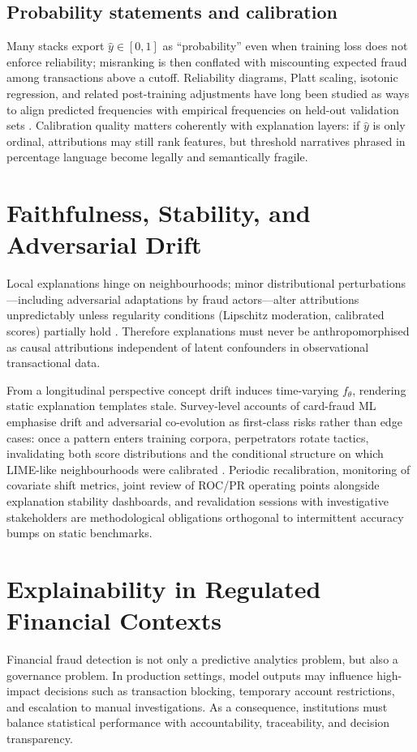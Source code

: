 \subsection{Probability statements and calibration}
Many stacks export $\hat{y}\in[0,1]$ as ``probability'' even when training loss does not enforce reliability; misranking is then conflated with miscounting expected fraud among transactions above a cutoff. Reliability diagrams, Platt scaling, isotonic regression, and related post-training adjustments have long been studied as ways to align predicted frequencies with empirical frequencies on held-out validation sets \cite{niculescu_caruana_calib2005,molnarInterpretableMachineLearningBook}. Calibration quality matters coherently with explanation layers: if $\hat{y}$ is only ordinal, attributions may still rank features, but threshold narratives phrased in percentage language become legally and semantically fragile.

\section{Faithfulness, Stability, and Adversarial Drift}
Local explanations hinge on neighbourhoods; minor distributional perturbations---including adversarial adaptations by fraud actors---alter attributions unpredictably unless regularity conditions (Lipschitz moderation, calibrated scores) partially hold \cite{xai_survey}. Therefore explanations must never be anthropomorphised as causal attributions independent of latent confounders in observational transactional data.

From a longitudinal perspective concept drift induces time-varying $f_{\theta}$, rendering static explanation templates stale. Survey-level accounts of card-fraud ML emphasise drift and adversarial co-evolution as first-class risks rather than edge cases: once a pattern enters training corpora, perpetrators rotate tactics, invalidating both score distributions and the conditional structure on which LIME-like neighbourhoods were calibrated \cite{lucas_jurgovsky_ccfraud_survey2020,xai_survey}. Periodic recalibration, monitoring of covariate shift metrics, joint review of ROC/PR operating points alongside explanation stability dashboards, and revalidation sessions with investigative stakeholders are methodological obligations orthogonal to intermittent accuracy bumps on static benchmarks.

\section{Explainability in Regulated Financial Contexts}
Financial fraud detection is not only a predictive analytics problem, but also a governance problem. In production settings, model outputs may influence high-impact decisions such as transaction blocking, temporary account restrictions, and escalation to manual investigations. As a consequence, institutions must balance statistical performance with accountability, traceability, and decision transparency.


